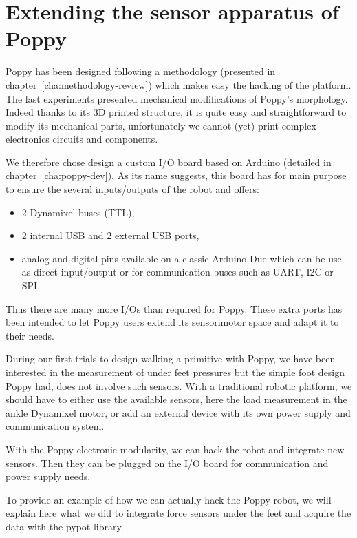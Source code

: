 
\newpage
\section{Extending the sensor apparatus of Poppy} %
\label{sec:morphology-adding-sensors}

Poppy has been designed following a methodology (presented in chapter~\ref{cha:methodology-review}) which makes easy the hacking of the platform.
The last experiments presented mechanical modifications of Poppy's morphology. Indeed thanks to its 3D printed structure, it is quite easy and straightforward to modify its mechanical parts, unfortunately we cannot (yet) print complex electronics circuits and components.

We therefore chose design a custom I/O board based on Arduino (detailed in chapter~\ref{cha:poppy-dev}). As its name suggests, this board has for main purpose to ensure the several inputs/outputs of the robot and offers:
\begin{itemize}
    \item 2 Dynamixel buses (TTL),
    \item 2 internal USB and 2 external USB ports,
    \item analog and digital pins available on a classic Arduino Due which can be use as direct input/output or for communication buses such as UART, I2C or SPI.
\end{itemize}
Thus there are many more I/Os than required for Poppy. These extra ports has been intended to let Poppy users extend its sensorimotor space and adapt it to their needs.


During our first trials to design walking a primitive with Poppy, we have been interested in the measurement of under feet pressures but the simple foot design Poppy had, does not involve such sensors. With a traditional robotic platform, we should have to either use the available sensors, here the load measurement in the ankle Dynamixel motor, or add an external device with its own power supply and communication system.

With the Poppy electronic modularity, we can hack the robot and integrate new sensors. Then they can be plugged on the I/O board for communication and power supply needs.

To provide an example of how we can actually hack the Poppy robot, we will explain here what we did to integrate force sensors under the feet and acquire the data with the pypot library.


